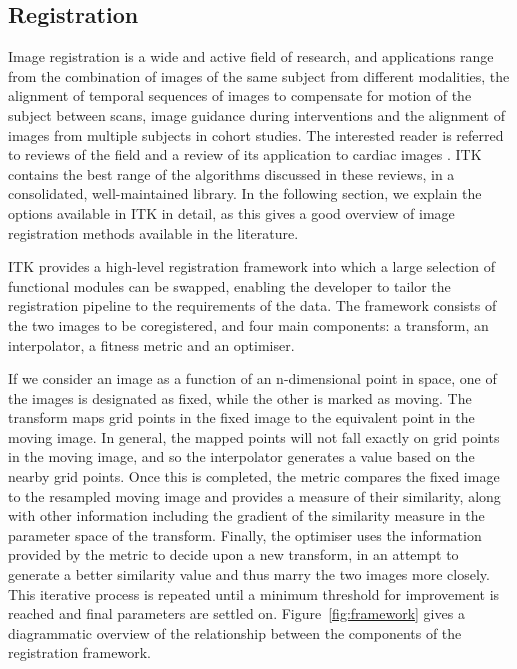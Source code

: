   \subsection{Registration} %
  \label{sub:registration}
    Image registration is a wide and active field of research, and applications range from the combination of images of the same subject from different modalities, the alignment of temporal sequences of images to compensate for motion of the subject between scans, image guidance during interventions and the alignment of images from multiple subjects in cohort studies. The interested reader is referred to reviews of the field \cite{Maintz1998,Hill2001,Zitova2003} and a review of its application to cardiac images \cite{Makela2002}. ITK contains the best range of the algorithms discussed in these reviews, in a consolidated, well-maintained library. In the following section, we explain the options available in ITK in detail, as this gives a good overview of image registration methods available in the literature.
  
    ITK provides a high-level registration framework into which a large selection of functional modules can be swapped, enabling the developer to tailor the registration pipeline to the requirements of the data. The framework consists of the two images to be coregistered, and four main components: a transform, an interpolator, a fitness metric and an optimiser.

    If we consider an image as a function of an n-dimensional point in space, one of the images is designated as fixed, while the other is marked as moving. The transform maps grid points in the fixed image to the equivalent point in the moving image. In general, the mapped points will not fall exactly on grid points in the moving image, and so the interpolator generates a value based on the nearby grid points. Once this is completed, the metric compares the fixed image to the resampled moving image and provides a measure of their similarity, along with other information including the gradient of the similarity measure in the parameter space of the transform. Finally, the optimiser uses the information provided by the metric to decide upon a new transform, in an attempt to generate a better similarity value and thus marry the two images more closely. This iterative process is repeated until a minimum threshold for improvement is reached and final parameters are settled on. Figure~\ref{fig:framework} gives a diagrammatic overview of the relationship between the components of the registration framework.

